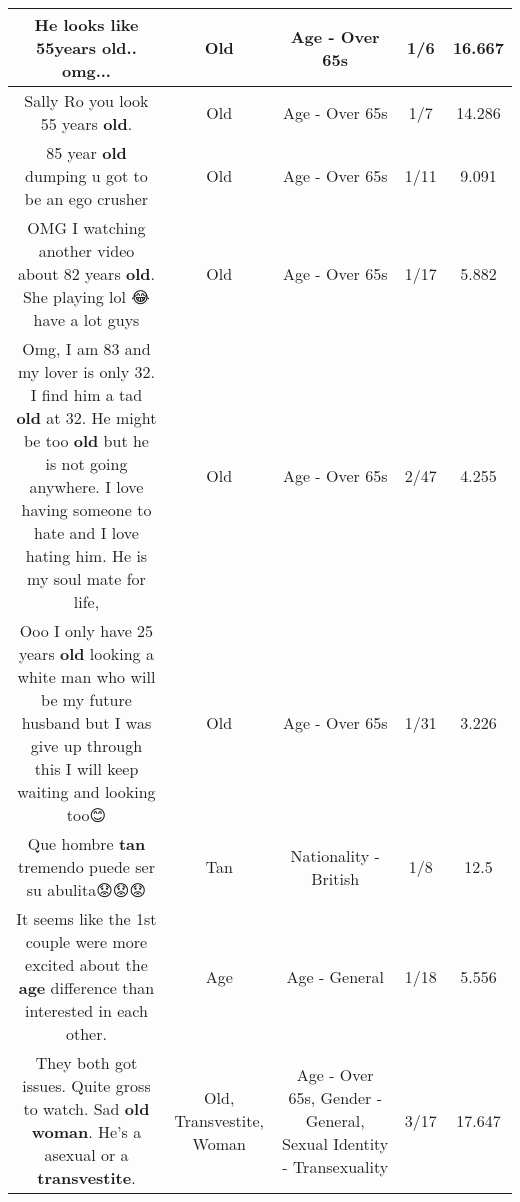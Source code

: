 \documentclass[11pt]{article}
\newlength\mylength
\begin{document}
\begin{center}
\begin{longtable}{|C{.65\mylength}|C{.30\mylength}|C{.12\mylength}|C{.12\mylength}|C{.12\mylength}|}
  \small He looks like 55years \textbf{old}.. omg...\normalsize   & Old & Age - Over 65s & 1/6 & 16.667 \\  \hline
  \small Sally Ro you look 55 years \textbf{old}.\normalsize   & Old & Age - Over 65s & 1/7 & 14.286 \\  \hline
  \small 85 year \textbf{old} dumping u got to be an ego crusher\normalsize   & Old & Age - Over 65s & 1/11 & 9.091 \\  \hline
  \small OMG I watching another video about 82  years \textbf{old}. She playing lol 😂 have a lot guys\normalsize   & Old & Age - Over 65s & 1/17 & 5.882 \\  \hline
  \small Omg, I am 83 and my lover is only 32. I find him a tad \textbf{old} at 32. He might be too \textbf{old} but he is not going anywhere. I love having someone to hate and I love hating him. He is my soul mate for life,\normalsize   & Old & Age - Over 65s & 2/47 & 4.255 \\  \hline
  \small Ooo I only have 25 years \textbf{old} looking a white man who will be my future husband but I was give up through this I will keep waiting and looking too😊\normalsize   & Old & Age - Over 65s & 1/31 & 3.226 \\  \hline
  \small Que hombre \textbf{tan} tremendo puede ser su abulita😟😟😟\normalsize   & Tan & Nationality - British & 1/8 & 12.5 \\  \hline
  \small It seems like the 1st couple were more excited about the \textbf{age} difference than interested in each other.\normalsize   & Age & Age - General & 1/18 & 5.556 \\  \hline
  \small They both got issues. Quite gross to watch. Sad \textbf{old} \textbf{woman}. He's a asexual or a \textbf{transvestite}.\normalsize   & Old, Transvestite, Woman & Age - Over 65s, Gender - General, Sexual Identity - Transexuality & 3/17 & 17.647 \\  \hline

\end{longtable}
\end{center}
\end{document}
